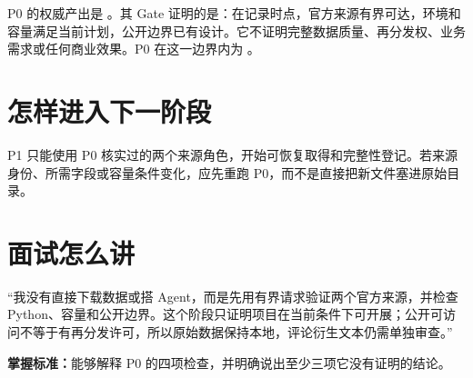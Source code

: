 P0 的权威产出是 。其 Gate 证明的是：在记录时点，官方来源有界可达，环境和容量满足当前计划，公开边界已有设计。它不证明完整数据质量、再分发权、业务需求或任何商业效果。P0 在这一边界内为 \statuspassed。

\section{怎样进入下一阶段}

P1 只能使用 P0 核实过的两个来源角色，开始可恢复取得和完整性登记。若来源身份、所需字段或容量条件变化，应先重跑 P0，而不是直接把新文件塞进原始目录。

\section{面试怎么讲}

\begin{interviewbox}
“我没有直接下载数据或搭 Agent，而是先用有界请求验证两个官方来源，并检查 Python、容量和公开边界。这个阶段只证明项目在当前条件下可开展；公开可访问不等于有再分发许可，所以原始数据保持本地，评论衍生文本仍需单独审查。”
\end{interviewbox}

\textbf{掌握标准：}能够解释 P0 的四项检查，并明确说出至少三项它没有证明的结论。
